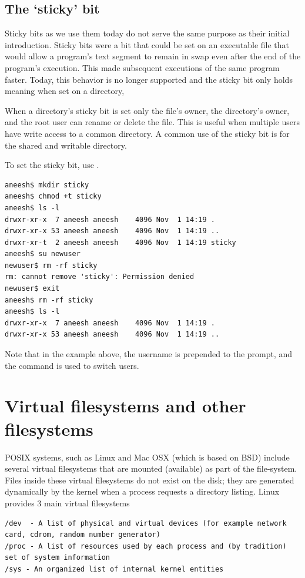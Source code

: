 \subsection{The `sticky' bit}

Sticky bits as we use them today do not serve the same purpose as their initial introduction. Sticky bits were a bit that could be set on an executable file that would allow a program's text segment to remain in swap even after the end of the program's execution. This made subsequent executions of the same program faster. Today, this behavior is no longer supported and the sticky bit only holds meaning when set on a directory,

When a directory's sticky bit is set only the file's owner, the directory's owner, and the root user can rename or delete the file. This is useful when multiple users have write access to a common directory. A common use of the sticky bit is for the shared and writable  directory.

To set the sticky bit, use .

\begin{verbatim}
aneesh$ mkdir sticky
aneesh$ chmod +t sticky
aneesh$ ls -l
drwxr-xr-x  7 aneesh aneesh    4096 Nov  1 14:19 .
drwxr-xr-x 53 aneesh aneesh    4096 Nov  1 14:19 ..
drwxr-xr-t  2 aneesh aneesh    4096 Nov  1 14:19 sticky
aneesh$ su newuser
newuser$ rm -rf sticky
rm: cannot remove 'sticky': Permission denied
newuser$ exit
aneesh$ rm -rf sticky
aneesh$ ls -l
drwxr-xr-x  7 aneesh aneesh    4096 Nov  1 14:19 .
drwxr-xr-x 53 aneesh aneesh    4096 Nov  1 14:19 ..
\end{verbatim}

Note that in the example above, the username is prepended to the prompt, and the command  is used to switch users.

\section{Virtual filesystems and other filesystems}

POSIX systems, such as Linux and Mac OSX (which is based on BSD) include several virtual filesystems that are mounted (available) as part of the file-system. Files inside these virtual filesystems do not exist on the disk; they are generated dynamically by the kernel when a process requests a directory listing. Linux provides 3 main virtual filesystems

\begin{verbatim}
/dev  - A list of physical and virtual devices (for example network card, cdrom, random number generator)
/proc - A list of resources used by each process and (by tradition) set of system information
/sys - An organized list of internal kernel entities
\end{verbatim}

